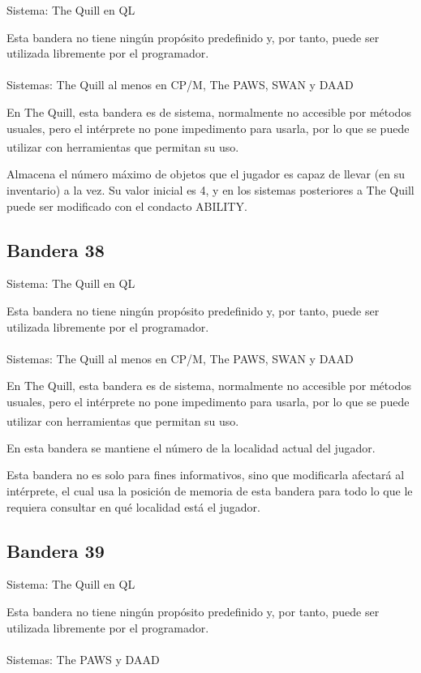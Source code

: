 \documentclass[11pt, a5paper]{article}
\newcommand{\quill}{\textsf{The Quill}\xspace}
\newcommand{\paw}{\textsf{The PAWS}\xspace}
\newcommand{\swan}{\textsf{SWAN}\xspace}
\newcommand{\daad}{\textsf{DAAD}\xspace}
\newcommand{\sistema}[1]{\noindent Sistema: #1 \nopagebreak}
\newcommand{\sistemas}[1]{\noindent Sistemas: #1 \nopagebreak}
\newcommand{\footnoteref}[2]{\hyperref[#1]{\textsuperscript{#2}}}
\begin{document}
\sistema{\quill en QL}

Esta bandera no tiene ningún propósito predefinido y, por tanto, puede ser utilizada libremente por el programador.
\\\ \\
\sistemas{\quill al menos en CP/M\cite{QuillQDB}, \paw, \swan y \daad}

En \quill, esta bandera es de sistema, normalmente no accesible por métodos usuales, pero el intérprete no pone impedimento para usarla, por lo que se puede utilizar con herramientas que permitan su uso\footnoteref{sysflagCPM}{\thesysflagCPM}.

Almacena el número máximo de objetos que el jugador es capaz de llevar (en su inventario) a la vez. Su valor inicial es 4, y en los sistemas posteriores a \quill puede ser modificado con el condacto ABILITY.

\subsection{Bandera 38}

\sistema{\quill en QL}

Esta bandera no tiene ningún propósito predefinido y, por tanto, puede ser utilizada libremente por el programador.
\\\ \\
\sistemas{\quill al menos en CP/M\cite{QuillQDB}, \paw, \swan y \daad}

En \quill, esta bandera es de sistema, normalmente no accesible por métodos usuales, pero el intérprete no pone impedimento para usarla, por lo que se puede utilizar con herramientas que permitan su uso\footnoteref{sysflagCPM}{\thesysflagCPM}.

En esta bandera se mantiene el número de la localidad actual del jugador.

Esta bandera no es solo para fines informativos, sino que modificarla afectará al intérprete, el cual usa la posición de memoria de esta bandera para todo lo que le requiera consultar en qué localidad está el jugador.

\subsection{Bandera 39}

\sistema{\quill en QL}

Esta bandera no tiene ningún propósito predefinido y, por tanto, puede ser utilizada libremente por el programador.
\\\ \\
\sistemas{\paw y \daad}
\end{document}
